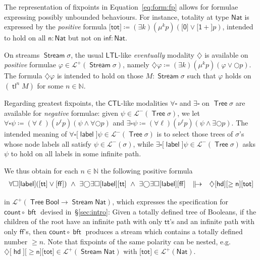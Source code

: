 \documentclass[%
  a4paper,
  UKenglish,
  cleveref,
  autoref,
  thm-restate,
  numberwithinsect,
]{lipics-v2021}
\newcommand\LTL{\mathsf{LTL}}
\newcommand\CTL{\mathsf{CTL}}
\newcommand\deq\coloneqq
\newcommand\NN{\mathbb{N}}
\newcommand\comp{\mathbin\circ}
\newcommand\Next{\mathord{\bigcirc}}
\renewcommand{\Box}{\square}
\newcommand{\Diam}{\diamondsuit}
\newcommand\term[1]{\mathsf{#1}}
\newcommand\type[1]{\term{#1}}
\newcommand\hd{\mathop{\term{hd}}}
\newcommand\tl{\mathop{\term{tl}}}
\newcommand\lbl{\mathop{\term{label}}}
\newcommand\cnt{\term{count}}
\newcommand\bft{\mathop{\term{bft}}}
\newcommand\arrow\to
\newcommand\Bool{\type{Bool}}
\newcommand\Nat{\type{Nat}}
\newcommand\Stream{\mathop{\type{Stream}}}
\newcommand\Tree{\mathop{\type{Tree}}}
\newcommand\true{\term{tt}}
\newcommand\false{\term{ff}}
\newcommand\defrealto{\mathrel\parallel\joinrel\to}
\newcommand\realto{\mathrel{\defrealto}}
\newcommand\PTbis{\sigma}	%
\newcommand\itvar{k}
\newcommand\itvarbis{\ell}
\newcommand\tot{\term{tot}}
\newcommand\FP{p}
\newcommand\finmu{\mu}
\newcommand\finnu{\nu}
\newcommand\Lang{\mathcal{L}}
\newcommand\form[1]{\lbrack #1 \rbrack}
\begin{document}
\begin{example}
\label{ex:form:fix}
The representation of fixpoints in Equation~\eqref{eq:form:fp}
allows for formulae expressing possibly unbounded behaviours.
For instance, totality at type $\Nat$ is expressed by the \emph{positive} formula
\(
  \form\tot
  \deq
  (\exists \itvar)(\finmu^\itvar \FP)(\form{\term 0} \lor \form{\term{1+}}\FP)
\),
intended to hold
on all $\term n \colon \Nat$ but not on $\term{inf} \colon \Nat$.

On streams $\Stream \PTbis$, the usual $\LTL$-like
\emph{eventually}
modality $\Diam$
is available on \emph{positive} formulae $\varphi \in \Lang^+(\Stream\PTbis)$,
namely
$\Diam \varphi \deq (\exists \itvar)(\finmu^\itvar \FP)(\varphi \lor \Next\FP)$.
The formula $\Diam \varphi$ is intended to hold on those $M \colon \Stream\PTbis$
such that $\varphi$ holds on $(\tl^n M)$ for some $n \in \NN$.

Regarding greatest fixpoints, the $\CTL$-like modalities
$\forall\Box$ and $\exists\Box$ on $\Tree \PTbis$ 
are available for \emph{negative} formulae: given $\psi \in \Lang^-(\Tree\PTbis)$,
we let
\(
  \forall \Box \psi
  \deq
  (\forall \itvarbis)(\finnu^\itvarbis \FP)(\psi \land \forall\Next \FP)
\)
and
\(
  \exists \Box \psi
  \deq
  (\forall \itvarbis)(\finnu^\itvarbis \FP)(\psi \land \exists\Next \FP)
\).
The intended meaning of $\forall\Box\form\lbl\psi \in \Lang^-(\Tree\PTbis)$
is to select those trees of $\PTbis$'s whose node labels all satisfy
$\psi \in \Lang^-(\PTbis)$,
while $\exists\Box\form\lbl\psi \in \Lang^-(\Tree\PTbis)$
asks $\psi$ to hold on all labels in some infinite path.

We thus obtain for each $n \in \NN$
the following positive formula 
\begin{equation}
\label{eq:form:spec}
\begin{array}{l l l}
  \forall\Box\form\lbl(\form\true \lor \form\false)
  ~\land~
  \exists\Next\exists\Box\form\lbl\form\true
  ~\land~
  \exists\Next\exists\Box\form\lbl\form\false
& \realto
& \Diam\form\hd \form{\geq \term n} \form\tot
\end{array}
\end{equation}

\noindent
in $\Lang^+(\Tree\Bool \arrow \Stream\Nat)$,
which expresses the specification for $\cnt \comp \bft$
devised in~\S\ref{sec:intro}:
Given a totally defined tree of Booleans,
if the children of the root have an infinite path with only $\true$'s
and an infinite path with only $\false$'s,
then $\cnt \comp \bft$ produces a stream which contains a totally
defined number $\geq n$.
%
Note that
fixpoints of the same polarity can be nested,
e.g.\
$\Diam\form\hd\form{\geq \term{n}}\form\tot \in \Lang^+(\Stream \Nat)$
with $\form\tot \in \Lang^+(\Nat)$.
\lipicsEnd
\end{example}
\end{document}
